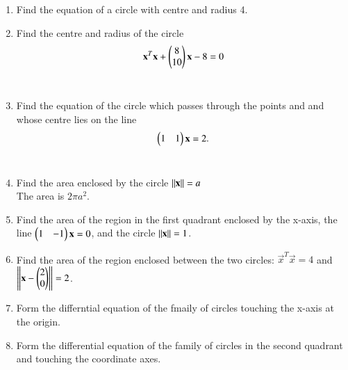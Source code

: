 \renewcommand{\theequation}{\theenumi}
\begin{enumerate}[label=\arabic*.,ref=\thesubsection.\theenumi]
\item Find the equation of a circle with centre  and radius 4.
\\
\solution 


\item Find the centre and radius of the circle
\begin{align}
\mathbf{x}^T\mathbf{x}+\begin{pmatrix}8\\10\end{pmatrix}\mathbf{x} -8= 0
\end{align}
%
\\
\solution 

\item Find the equation of the circle which passes through the points  and  and whose centre lies on the line 
\begin{align}
\label{eq:4.1.3_line}
\begin{pmatrix}1 & 1\end{pmatrix} \mathbf{x} = 2.
\end{align}
\\
\solution 

\item Find the area enclosed by the circle $\left\lVert\mathbf{x}\right\rVert = a$
%
\\
\solution The area is $2\pi a^2$.
%
\item Find the area of the region in the first quadrant enclosed by the x-axis, the line $\begin{pmatrix}1 & -1\end{pmatrix}\mathbf{x} = 0$, and the circle $\left\lVert\mathbf{x}\right\rVert = 1$.
%
\item Find the area of the region enclosed between the two circles: $\vec{x}^T\vec{x} = 4$ and $\left\lVert\mathbf{x}-\begin{pmatrix}2\\0\end{pmatrix}\right\rVert = 2$.
%
\\
\solution 

\item Form the differntial equation of the fmaily of circles touching the x-axis at the origin.
%
\item Form the differential equation of the family of circles in the second quadrant and touching the coordinate axes.
\end{enumerate}
